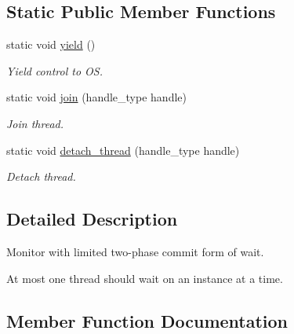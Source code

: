 \subsection*{Static Public Member Functions}
\begin{DoxyCompactItemize}
\item 
static void \hyperlink{classrml_1_1internal_1_1thread__monitor_a5c286f93f53ec2ac4f0d70650ba32b92}{yield} ()
\begin{DoxyCompactList}\small\item\em Yield control to O\+S. \end{DoxyCompactList}\item 
\hypertarget{classrml_1_1internal_1_1thread__monitor_a2be9fe6a3ec89c83442b2acd31d87df7}{}static void \hyperlink{classrml_1_1internal_1_1thread__monitor_a2be9fe6a3ec89c83442b2acd31d87df7}{join} (handle\+\_\+type handle)\label{classrml_1_1internal_1_1thread__monitor_a2be9fe6a3ec89c83442b2acd31d87df7}

\begin{DoxyCompactList}\small\item\em Join thread. \end{DoxyCompactList}\item 
\hypertarget{classrml_1_1internal_1_1thread__monitor_aaec978fb92f21dd1823401f7fd1d6f24}{}static void \hyperlink{classrml_1_1internal_1_1thread__monitor_aaec978fb92f21dd1823401f7fd1d6f24}{detach\+\_\+thread} (handle\+\_\+type handle)\label{classrml_1_1internal_1_1thread__monitor_aaec978fb92f21dd1823401f7fd1d6f24}

\begin{DoxyCompactList}\small\item\em Detach thread. \end{DoxyCompactList}\end{DoxyCompactItemize}


\subsection{Detailed Description}
Monitor with limited two-\/phase commit form of wait. 

At most one thread should wait on an instance at a time. 

\subsection{Member Function Documentation}
\hypertarget{classrml_1_1internal_1_1thread__monitor_a3d1ae1d2476f27d49814bedd78bca43a}{}
